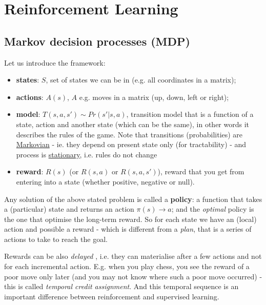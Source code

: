 \documentclass[11pt]{article}
\begin{document}
\section{Reinforcement Learning}	\label{reinforcement_learning}

\subsection{Markov decision processes (MDP)} \label{mdp}
Let us introduce the framework:
\begin{itemize}
	\item \textbf{states}: $S$, set of states we can be in (e.g. all coordinates in a matrix);
	\item \textbf{actions}: $A(s)$, $A$ e.g. moves in a matrix (up, down, left or right);
	\item \textbf{model}: $T(s,a,s') \sim Pr(s'|s,a)$, transition model that is a function of a state, action and another state (which can be the same), in other words it describes the rules of the game. Note that transitions (probabilities) are \underline{Markovian} - ie. they depend on present state only (for tractability) - and process is \underline{stationary}, i.e. rules do not change
	\item \textbf{reward}: $R(s)$ (or $R(s,a)$ or $R(s,a,s')$), reward that you get from entering into a state (whether positive, negative or null).
\end{itemize}
Any solution of the above stated problem is called a \textbf{policy}: a function that takes a (particular) state and returns an action $\pi(s) \rightarrow a$;  and the \textit{optimal} policy is the one that optimise the long-term reward. So for each state we have an (local) action and possible a reward - which is different from a \textit{plan}, that is a series of actions to take to reach the goal.  

Rewards can be also \textit{delayed} , i.e. they can materialise after a few actions and not for each incremental action. E.g. when you play chess, you see the reward of a poor move only later (and you may not know where such a poor move occurred) - this is called \textit{temporal credit assignment}. And this temporal sequence is an important difference between reinforcement and supervised learning.
\end{document}
